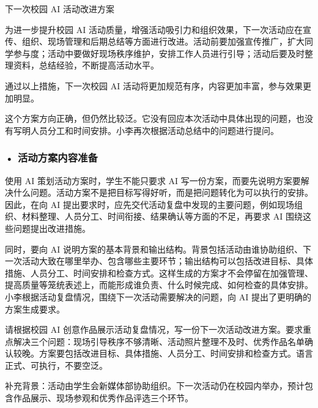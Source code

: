 \begin{aibox}
下一次校园 AI 活动改进方案

为进一步提升校园 AI 活动质量，增强活动吸引力和组织效果，下一次活动应在宣传、组织、现场管理和后期总结等方面进行改进。活动前要加强宣传推广，扩大同学参与度；活动中要做好现场秩序维护，安排工作人员进行引导；活动后要及时整理资料，总结经验，不断提高活动水平。

通过以上措施，下一次校园 AI 活动将更加规范有序，内容更加丰富，参与效果更加明显。
\end{aibox}

这个方案方向正确，但仍然比较泛。它没有回应本次活动中具体出现的问题，也没有写明人员分工和时间安排。小李再次根据活动总结中的问题进行提问。

\subsubsection*{\textbf{• 活动方案内容准备}}

使用 AI 策划活动方案时，学生不能只要求 AI 写一份方案，而要先说明方案要解决什么问题。活动方案不是把目标写得好听，而是把问题转化为可以执行的安排。因此，在向 AI 提出要求时，应先交代活动复盘中发现的主要问题，例如现场组织、材料整理、人员分工、时间衔接、结果确认等方面的不足，再要求 AI 围绕这些问题提出改进措施。

同时，要向 AI 说明方案的基本背景和输出结构。背景包括活动由谁协助组织、下一次活动大致在哪里举办、包含哪些主要环节；输出结构可以包括改进目标、具体措施、人员分工、时间安排和检查方式。这样生成的方案才不会停留在加强管理、提高质量等笼统表述上，而能形成谁负责、什么时候完成、如何检查的具体安排。小李根据活动复盘情况，围绕下一次活动需要解决的问题，向 AI 提出了更明确的方案生成要求。


\begin{userbox}
请根据校园 AI 创意作品展示活动复盘情况，写一份下一次活动改进方案。要求重点解决三个问题：现场引导秩序不够清晰、活动照片整理不及时、优秀作品名单确认较晚。方案要包括改进目标、具体措施、人员分工、时间安排和检查方式。语言正式、可执行，不要空泛。

补充背景：活动由学生会新媒体部协助组织。下一次活动仍在校园内举办，预计包含作品展示、现场参观和优秀作品评选三个环节。
\end{userbox}

